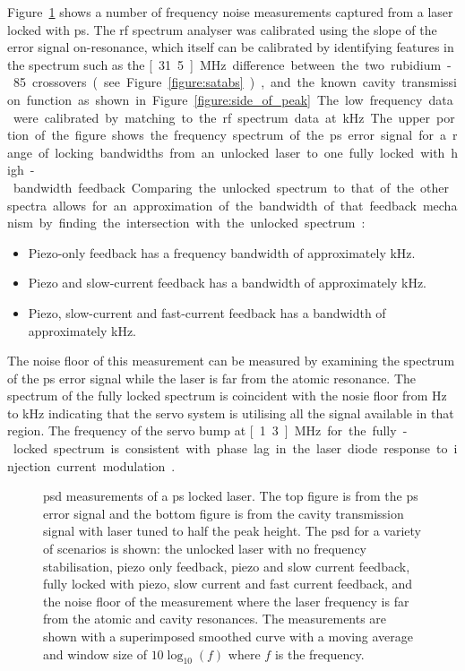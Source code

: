 Figure~\ref{figure:psd} shows a number of frequency noise measurements captured from a laser locked with \gls{ps}.
The \gls{rf} spectrum analyser was calibrated using the slope of the error signal on-resonance, which itself can be calibrated by identifying features in the spectrum such as the \unit[31.5]{MHz} difference between the two rubidium-85 crossovers (see Figure~\ref{figure:satabs}), and the known cavity transmission function as shown in Figure~\ref{figure:side_of_peak}.
The low frequency data were calibrated by matching to the \gls{rf} spectrum data at \unit[10]{kHz}.
The upper portion of the figure shows the frequency spectrum of the \gls{ps} error signal for a range of locking bandwidths from an unlocked laser to one fully locked with high-bandwidth feedback.
Comparing the unlocked spectrum to that of the other spectra allows for an approximation of the bandwidth of that feedback mechanism by finding the intersection with the unlocked spectrum:
\begin{itemize}
    \item Piezo-only feedback has a frequency bandwidth of approximately \unit[1]{kHz}.
    \item Piezo and slow-current feedback has a bandwidth of approximately \unit[50]{kHz}.
    \item Piezo, slow-current and fast-current feedback has a bandwidth of approximately \unit[500]{kHz}.
\end{itemize}
The noise floor of this measurement can be measured by examining the spectrum of the \gls{ps} error signal while the laser is far from the atomic resonance.
The spectrum of the fully locked spectrum is coincident with the nosie floor from \unit[450]{Hz} to \unit[350]{kHz} indicating that the servo system is utilising all the signal available in that region.
The frequency of the servo bump at \unit[1.3]{MHz} for the fully-locked spectrum is consistent with phase lag in the laser diode response to injection current modulation~\cite{wieman_using_1991}.

\begin{figure}
\center

\caption[Laser frequency noise power spectral density from polarisation spectroscopy error signal and cavity transmission for a polarisation spectroscopy locked laser.]{\Gls{psd} measurements of a \gls{ps} locked laser.
The top figure is from the \gls{ps} error signal and the bottom figure is from the cavity transmission signal with laser tuned to half the peak height.
The \gls{psd} for a variety of scenarios is shown: the unlocked laser with no frequency stabilisation, piezo only feedback, piezo and slow current feedback, fully locked with piezo, slow current and fast current feedback, and the noise floor of the measurement where the laser frequency is far from the atomic and cavity resonances.
The measurements are shown with a superimposed smoothed curve with a moving average and window size of $10\log_{10}(f)$ where $f$ is the frequency.}
\label{figure:psd}
\end{figure}

